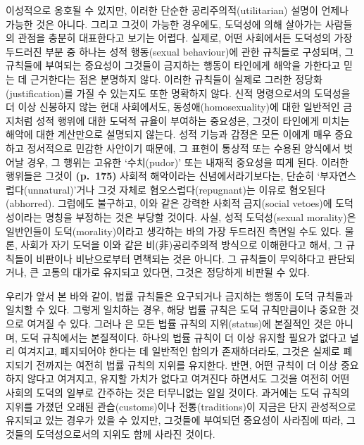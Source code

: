 \begin{enumerate}
  이성적으로 옹호될 수 있지만, 이러한 단순한 공리주의적(utilitarian)
  설명이 언제나 가능한 것은 아니다. 그리고 그것이 가능한 경우에도,
  도덕성에 의해 살아가는 사람들의 관점을 충분히 대표한다고 보기는
  어렵다. 실제로, 어떤 사회에서든 도덕성의 가장 두드러진 부분 중 하나는
  성적 행동(sexual behaviour)에 관한 규칙들로 구성되며, 그 규칙들에
  부여되는 중요성이 그것들이 금지하는 행동이 타인에게 해악을 가한다고
  믿는 데 근거한다는 점은 분명하지 않다. 이러한 규칙들이 실제로 그러한
  정당화(justification)를 가질 수 있는지도 또한 명확하지 않다. 신적
  명령으로서의 도덕성을 더 이상 신봉하지 않는 현대 사회에서도,
  동성애(homosexuality)에 대한 일반적인 금지처럼 성적 행위에 대한 도덕적
  규율이 부여하는 중요성은, 그것이 타인에게 미치는 해악에 대한
  계산만으로 설명되지 않는다. 성적 기능과 감정은 모든 이에게 매우
  중요하고 정서적으로 민감한 사안이기 때문에, 그 표현이 통상적 또는
  수용된 양식에서 벗어날 경우, 그 행위는 고유한 `수치(pudor)' 또는
  내재적 중요성을 띠게 된다. 이러한 행위들은 그것이 \textbf{(p.~175)}
  사회적 해악이라는 신념에서라기보다는, 단순히
  `부자연스럽다(unnatural)'거나 그것 자체로 혐오스럽다(repugnant)는
  이유로 혐오된다(abhorred). 그럼에도 불구하고, 이와 같은 강력한 사회적
  금지(social vetoes)에 도덕성이라는 명칭을 부정하는 것은 부당할 것이다.
  사실, 성적 도덕성(sexual morality)은 일반인들이 도덕(morality)이라고
  생각하는 바의 가장 두드러진 측면일 수도 있다. 물론, 사회가 자기 도덕을
  이와 같은 비(非)공리주의적 방식으로 이해한다고 해서, 그 규칙들이
  비판이나 비난으로부터 면책되는 것은 아니다. 그 규칙들이 무익하다고
  판단되거나, 큰 고통의 대가로 유지되고 있다면, 그것은 정당하게 비판될
  수 있다.
\end{enumerate}

우리가 앞서 본 바와 같이, 법률 규칙들은 요구되거나 금지하는 행동이 도덕
규칙들과 일치할 수 있다. 그렇게 일치하는 경우, 해당 법률 규칙은 도덕
규칙만큼이나 중요한 것으로 여겨질 수 있다. 그러나
은 모든 법률 규칙의 지위(status)에 본질적인
것은 아니며, 도덕 규칙에서는 본질적이다. 하나의 법률 규칙이 더 이상
유지할 필요가 없다고 널리 여겨지고, 폐지되어야 한다는 데 일반적인 합의가
존재하더라도, 그것은 실제로 폐지되기 전까지는 여전히 법률 규칙의 지위를
유지한다. 반면, 어떤 규칙이 더 이상 중요하지 않다고 여겨지고, 유지할
가치가 없다고 여겨진다 하면서도 그것을 여전히 어떤 사회의 도덕의 일부로
간주하는 것은 터무니없는 일일 것이다. 과거에는 도덕 규칙의 지위를 가졌던
오래된 관습(customs)이나 전통(traditions)이 지금은 단지 관성적으로
유지되고 있는 경우가 있을 수 있지만, 그것들에 부여되던 중요성이 사라짐에
따라, 그것들의 도덕성으로서의 지위도 함께 사라진 것이다.

